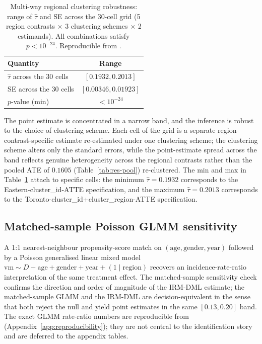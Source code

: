 \documentclass[article,shortnames,nojss]{jss}
\newcommand{\vm}{\ensuremath{\mathrm{vm}}}
\begin{document}
\begin{table}[h]
\centering
\caption{Multi-way regional clustering robustness: range of
$\hat{\tau}$ and SE across the 30-cell grid (5 region contrasts
$\times$ 3 clustering schemes $\times$ 2 estimands). All
combinations satisfy $p < 10^{-24}$. Reproducible from
.}
\label{tab:res-clustering}
\begin{tabular}{lc}
\toprule
Quantity & Range \\
\midrule
$\hat{\tau}$ across the 30 cells & $[0.1932, 0.2013]$ \\
SE across the 30 cells & $[0.00346, 0.01923]$ \\
$p$-value (min) & $< 10^{-24}$ \\
\bottomrule
\end{tabular}
\end{table}

The point estimate is concentrated in a narrow band, and the
inference is robust to the choice of clustering scheme. Each cell
of the grid is a separate region-contrast-specific estimate
re-estimated under one clustering scheme; the clustering scheme
alters only the standard errors, while the point-estimate spread
across the band reflects genuine heterogeneity across the regional
contrasts rather than the pooled ATE of $0.1605$
(Table~\ref{tab:res-pool}) re-clustered. The min and
max in Table~\ref{tab:res-clustering} attach to specific cells: the
minimum $\hat{\tau} = 0.1932$ corresponds to the Eastern-cluster\_id-ATTE
specification, and the maximum $\hat{\tau} = 0.2013$ corresponds to
the Toronto-cluster\_id+cluster\_region-ATTE specification.

\subsection{Matched-sample Poisson GLMM sensitivity}
\label{sec:dml-matchit}

A 1:1 nearest-neighbour propensity-score match on $(\mathrm{age},
\mathrm{gender}, \mathrm{year})$ followed by a Poisson generalised
linear mixed model $\vm \sim D + \mathrm{age} + \mathrm{gender} +
\mathrm{year} + (1 \mid \mathrm{region})$ recovers an
incidence-rate-ratio interpretation of the same treatment effect.
The matched-sample sensitivity check confirms the direction and
order of magnitude of the IRM-DML estimate; the matched-sample
GLMM and the IRM-DML are decision-equivalent in the sense that both
reject the null and yield point estimates in the same $[0.13, 0.20]$
band. The exact GLMM rate-ratio numbers are reproducible from
(Appendix~\ref{app:reproducibility}); they are not central to the
identification story and are deferred to the appendix tables.
\end{document}
